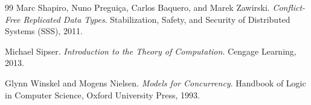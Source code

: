 \documentclass[12pt]{article}
\begin{document}
\begin{thebibliography}{99}
Marc Shapiro, Nuno Preguiça, Carlos Baquero, and Marek Zawirski.
\textit{Conflict-Free Replicated Data Types}.
Stabilization, Safety, and Security of Distributed Systems (SSS), 2011.

Michael Sipser.
\textit{Introduction to the Theory of Computation}.
Cengage Learning, 2013.

Glynn Winskel and Mogens Nielsen.
\textit{Models for Concurrency}.
Handbook of Logic in Computer Science, Oxford University Press, 1993.

\end{thebibliography}
\end{document}
